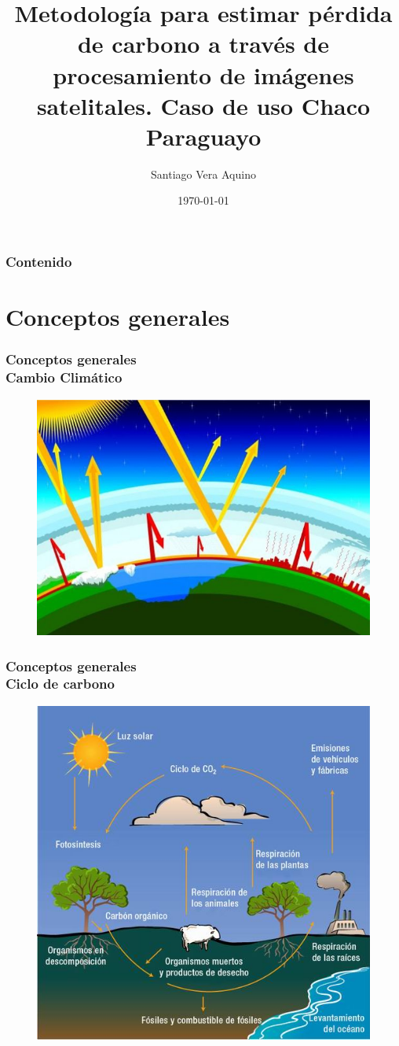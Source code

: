 \documentclass[xcolor=table]{beamer}
\title[]{Metodolog\'ia para estimar p\'erdida de
	carbono a trav\'es de procesamiento de im\'agenes
	satelitales. Caso de uso Chaco Paraguayo} %
\author{Santiago Vera Aquino} %
\institute[FP-UNA] %
{
	Universidad Nacional de Asunci\'on \\ %
	Facultad Polit\'ecnica \\
	Ingenier\'ia en Inform\'atica \\
	\medskip
	\textit{Proyecto Final de grado} %
}
\date{\today} %
\begin{document}
	
	\begin{frame}
		\titlepage %
	\end{frame}
	
	
	\begin{frame}
		\frametitle{Contenido}
		\tableofcontents %
	\end{frame}
	
	\section{Conceptos generales}
	\begin{frame}
		\frametitle{Conceptos generales\\Cambio Clim\'atico}
		
		\begin{figure}
			\centering
			\includegraphics[width=0.7\linewidth]{imagenes/cap2/calentamientoGlobal}
			\label{fig:calentamientoGlobal}
		\end{figure}
	\end{frame}
	
	
	\begin{frame}
		\frametitle{Conceptos generales\\Ciclo de carbono}		
		\begin{figure}
			\centering
			\includegraphics[width=0.5\linewidth]{imagenes/cicloCarbono}
			\label{fig:cicloCarbono}
		\end{figure}
	\end{frame}
	
\end{document}
